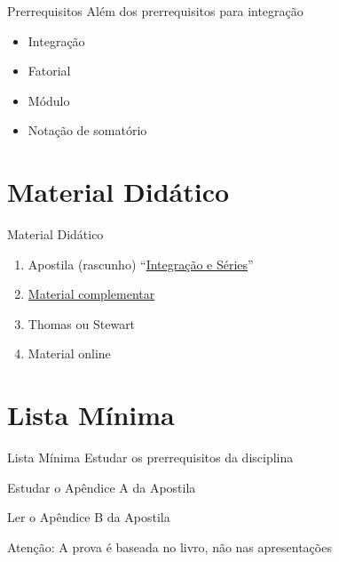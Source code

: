 \begin{frame}{Prerrequisitos}
  Além dos prerrequisitos para integração
  \begin{itemize}[<+->]
    \item Integração
    \item Fatorial
    \item Módulo
    \item Notação de somatório
  \end{itemize}
\end{frame}

\section{Material Didático}

\begin{frame}{Material Didático}
  \begin{enumerate}[<+->]
    \item Apostila (rascunho)  ``\href{https://sites.google.com/view/prof-luis-dafonseca/gradua\%C3\%A7\%C3\%A3o/Integrais-e-Series}{Integração e Séries}''
    \item \href{https://drive.google.com/drive/u/2/folders/1Bb1hqfdwt6E3jZpB8L4HRhbtW-UopeNB}{Material complementar}
    \item Thomas ou Stewart
    \item Material online
  \end{enumerate}
\end{frame}

\section{Lista Mínima}

\begin{frame}{Lista Mínima}
  Estudar os prerrequisitos da disciplina

  Estudar o Apêndice A da Apostila

  Ler o Apêndice B da Apostila

  \vfill
  Atenção: A prova é baseada no livro, não nas apresentações
\end{frame}


